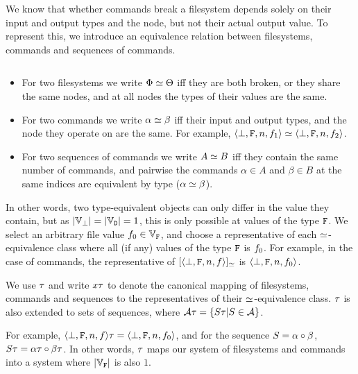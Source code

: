 \bigskip


\noindent
We know that whether commands break a filesystem depends solely on their input and output
types and the node, but not their actual output value.
To represent this, we introduce an equivalence relation between filesystems, commands
and sequences of commands.
\begin{mydef}
$ $ %
\begin{itemize}
\item For two filesystems we write $\Phi\simeq\Theta$ iff they are both broken, or they share the same nodes,
and at all nodes the types of their values are the same.
\item For two commands we write $\alpha\simeq\beta$ iff their input and output types,
and the node they operate on are the same.
For example, $\langle{\bot,\mathtt{F},n,f_1}\rangle\simeq\langle{\bot,\mathtt{F},n,f_2}\rangle$.
\item For two sequences of commands we write $A\simeq B$ iff they contain the same number of commands,
and pairwise the commands $\alpha\in A$ and $\beta\in B$ at the same indices are equivalent by type ($\alpha\simeq\beta$).
\end{itemize}
\end{mydef}

In other words, two type-equivalent objects can only differ in the value they contain,
but as $|\mathbb{V}_{\bot}|=|\mathbb{V}_{\mathtt{D}}|=1$, this is only possible at values of the type $\mathtt{F}$.
We select an arbitrary file value $f_0\in\mathbb{V}_{\mathtt{F}}$, and choose a representative
of each $\simeq$-equivalence class where all (if any) values of the type $\mathtt{F}$ is $f_0$.
For example, in the case of commands, the representative of $[\langle{\bot,\mathtt{F},n,f}\rangle]_\simeq$ is $\langle{\bot,\mathtt{F},n,f_0}\rangle$.

\begin{mydef}[$\T$]
We use $\T$ and write $x\tau$ to denote the canonical mapping of 
filesystems, commands and sequences to the
representatives of their $\simeq$-equivalence class.
$\T$ is also extended to sets of sequences,
where $\mathcal{A}\tau = \{S\tau | S\in\mathcal{A}\}$.
\end{mydef}

For example, $\langle{\bot,\mathtt{F},n,f}\rangle\tau = \langle{\bot,\mathtt{F},n,f_0}\rangle$,
and for the sequence $S=\alpha\circ\beta$, $S\tau=\alpha\tau\circ\beta\tau$.
In other words, $\T$ maps our system of filesystems and commands
into a system where $|\mathbb{V}_{\mathtt{F}}|$ is also $1$.

